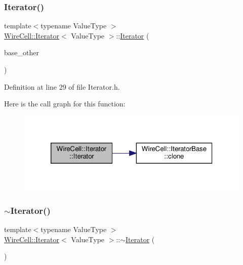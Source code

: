 \subsubsection{\texorpdfstring{Iterator()}{Iterator()}\hspace{0.1cm}{\footnotesize\ttfamily [3/3]}}
{\footnotesize\ttfamily template$<$typename Value\+Type $>$ \\
\hyperlink{class_wire_cell_1_1_iterator}{Wire\+Cell\+::\+Iterator}$<$ Value\+Type $>$\+::\hyperlink{class_wire_cell_1_1_iterator}{Iterator} (\begin{DoxyParamCaption}\item[{const \hyperlink{class_wire_cell_1_1_iterator_a06a62ddc776c46b8ff2f26c1e1c90546}{Base\+Iterator\+Type} \&}]{base\+\_\+other }\end{DoxyParamCaption})\hspace{0.3cm}{\ttfamily [inline]}}



Definition at line 29 of file Iterator.\+h.

Here is the call graph for this function\+:
\nopagebreak
\begin{figure}[H]
\begin{center}
\leavevmode
\includegraphics[width=320pt]{class_wire_cell_1_1_iterator_a1580729c388237b04a7f94ba538fcb70_cgraph}
\end{center}
\end{figure}
\mbox{\label{class_wire_cell_1_1_iterator_a35d1e64bce3842c639d7452672baae80}} 
\subsubsection{\texorpdfstring{$\sim$\+Iterator()}{~Iterator()}}
{\footnotesize\ttfamily template$<$typename Value\+Type $>$ \\
\hyperlink{class_wire_cell_1_1_iterator}{Wire\+Cell\+::\+Iterator}$<$ Value\+Type $>$\+::$\sim$\hyperlink{class_wire_cell_1_1_iterator}{Iterator} (\begin{DoxyParamCaption}{ }\end{DoxyParamCaption})\hspace{0.3cm}{\ttfamily [inline]}}



